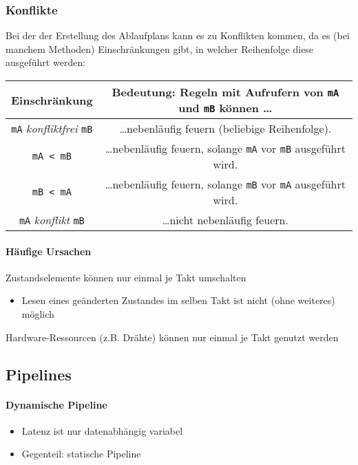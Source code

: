 			\subsubsection{Konflikte}
				Bei der der Erstellung des Ablaufplans kann es zu Konflikten kommen, da es (bei manchem Methoden) Einschränkungen gibt, in welcher Reihenfolge diese ausgeführt werden:
				\begin{table}[ht]
					\centering
					\begin{tabular}{c c}
						Einschränkung & Bedeutung: Regeln mit Aufrufern von \texttt{mA} und \texttt{mB} können \dots \\
						\hline
						\texttt{mA} \textit{konfliktfrei} \texttt{mB} & \dots nebenläufig feuern (beliebige Reihenfolge). \\
						\texttt{mA < mB} & \dots nebenläufig feuern, solange \texttt{mA} vor \texttt{mB} ausgeführt wird. \\
						\texttt{mB < mA} & \dots nebenläufig feuern, solange \texttt{mB} vor \texttt{mA} ausgeführt wird. \\
						\texttt{mA} \textit{konflikt} \texttt{mB} & \dots nicht nebenläufig feuern. \\
					\end{tabular}
				\end{table}
				
				\paragraph{Häufige Ursachen}
					\begin{description}[leftmargin = 5cm]
						\item[Rule Ordering Conflict] Zustandselemente können nur einmal je Takt umschalten
							\begin{itemize}
								\item Lesen eines geänderten Zustandes im selben Takt ist nicht (ohne weiteres) möglich
							\end{itemize}
						\item[Rule Resource Conflict] Hardware-Ressourcen (z.B. Drähte) können nur einmal je Takt genutzt werden
					\end{description}
		
		\subsection{Pipelines}
			\paragraph{Dynamische Pipeline}
				\begin{itemize}
					\item Latenz ist nur datenabhängig variabel
					\item Gegenteil: statische Pipeline
				\end{itemize}
			
